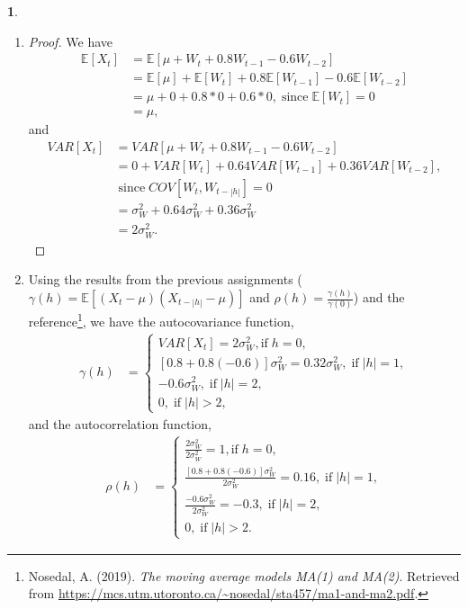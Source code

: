 \documentclass[10pt]{article}
\newtheorem{prob}{\bm{$Problem$}}
\begin{document}
\begin{prob}
\end{prob}
\begin{enumerate}[1)]
\vspace{3mm}

\item
\begin{proof}
We have
\begin{align*}
\mathbb{E}[X_t]&=\mathbb{E}[\mu+W_t+0.8W_{t-1}-0.6W_{t-2}]\\
&=\mathbb{E}[\mu]+\mathbb{E}[W_t]+0.8\mathbb{E}[W_{t-1}]-0.6\mathbb{E}[W_{t-2}]\\
&=\mu+0+0.8*0+0.6*0,\;\textrm{since}\;\mathbb{E}[W_t]=0\\
&=\mu,
\end{align*}
and
\begin{align*}
VAR[X_t]&=VAR[\mu+W_t+0.8W_{t-1}-0.6W_{t-2}]\\
&=0+VAR[W_t]+0.64VAR[W_{t-1}]+0.36VAR[W_{t-2}],\\
&\;\textrm{since}\;COV[W_t, W_{t-|h|}]=0\\
&=\sigma_W^2+0.64\sigma_W^2+0.36\sigma_W^2\\
&=2\sigma_W^2.
\end{align*}
\end{proof}
\vspace{3mm}

\item
Using the results from the previous assignments ($\gamma(h)=\mathbb{E}[(X_t-\mu)(X_{t-|h|}-\mu)]$ and $\rho(h)=\frac{\gamma(h)}{\gamma(0)}$) and the reference\footnote{ Nosedal, A. (2019). \textit{The moving average models MA(1) and MA(2)}. Retrieved from \url{https://mcs.utm.utoronto.ca/~nosedal/sta457/ma1-and-ma2.pdf}.}, we have the autocovariance function,
\begin{align*}
\gamma(h)&=\left\{\begin{array}{ll}VAR[X_t]=2\sigma_W^2,\textrm{if}\;h=0,\\
{[0.8+0.8(-0.6)]}\sigma_W^2=0.32\sigma_W^2,\;\textrm{if}\;|h|=1,\\
-0.6\sigma_W^2,\;\textrm{if}\;|h|=2,\\
0,\;\textrm{if}\;|h|>2,\end{array}\right.
\end{align*}
and the autocorrelation function,
\begin{align*}
\rho(h)&=\left\{\begin{array}{ll}\frac{2\sigma_W^2}{2\sigma_W^2}=1,\textrm{if}\;h=0,\\
\frac{[0.8+0.8(-0.6)]\sigma_W^2}{2\sigma_W^2}=0.16,\;\textrm{if}\;|h|=1,\\
\frac{-0.6\sigma_W^2}{2\sigma_W^2}=-0.3,\;\textrm{if}\;|h|=2,\\
0,\;\textrm{if}\;|h|>2.\end{array}\right.
\end{align*}
\vspace{3mm}


\end{enumerate}
\end{document}
